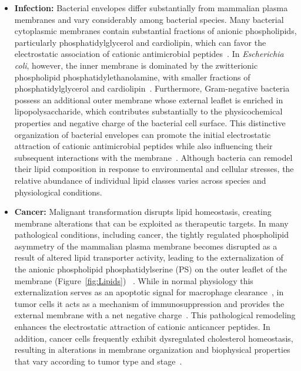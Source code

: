 \begin{itemize}
    \item \textbf{Infection:} Bacterial envelopes differ substantially from mammalian plasma membranes and vary considerably among bacterial species. Many bacterial cytoplasmic membranes contain substantial fractions of anionic phospholipids, particularly phosphatidylglycerol and cardiolipin, which can favor the electrostatic association of cationic antimicrobial peptides~\cite{bacterial_bilayer_1,bacterial_bilayer_2,Geiger2013}. In \textit{Escherichia coli}, however, the inner membrane is dominated by the zwitterionic phospholipid phosphatidylethanolamine, with smaller fractions of phosphatidylglycerol and cardiolipin~\cite{van2008membrane,bacterial_bilayer_1}. Furthermore, Gram-negative bacteria possess an additional outer membrane whose external leaflet is enriched in lipopolysaccharide, which contributes substantially to the physicochemical properties and negative charge of the bacterial cell surface. This distinctive organization of bacterial envelopes can promote the initial electrostatic attraction of cationic antimicrobial peptides while also influencing their subsequent interactions with the membrane~\cite{bacteria_bilayer_4,vejzovic2026bacterial}. Although bacteria can remodel their lipid composition in response to environmental and cellular stresses, the relative abundance of individual lipid classes varies across species and physiological conditions.
    
    \item \textbf{Cancer:} Malignant transformation disrupts lipid homeostasis, creating membrane alterations that can be exploited as therapeutic targets. In many pathological conditions, including cancer, the tightly regulated phospholipid asymmetry of the mammalian plasma membrane becomes disrupted as a result of altered lipid transporter activity, leading to the externalization of the anionic phospholipid phosphatidylserine (PS) on the outer leaflet of the membrane (Figure~\ref{fig:Lipids}) ~\cite{van2008membrane,Nagata2016,Szlasa2020}. While in normal physiology this externalization serves as an apoptotic signal for macrophage clearance~\cite{cancer_bilayer_1}, in tumor cells it acts as a mechanism of immunosuppression and provides the external membrane with a net negative charge~\cite{Szlasa2020,Fu2021,cancer_bilayer_2,cancer_bilayer_3}. This pathological remodeling enhances the electrostatic attraction of cationic anticancer peptides. In addition, cancer cells frequently exhibit dysregulated cholesterol homeostasis, resulting in alterations in membrane organization and biophysical properties that vary according to tumor type and stage~\cite{Szlasa2020}.
    

\end{itemize}
